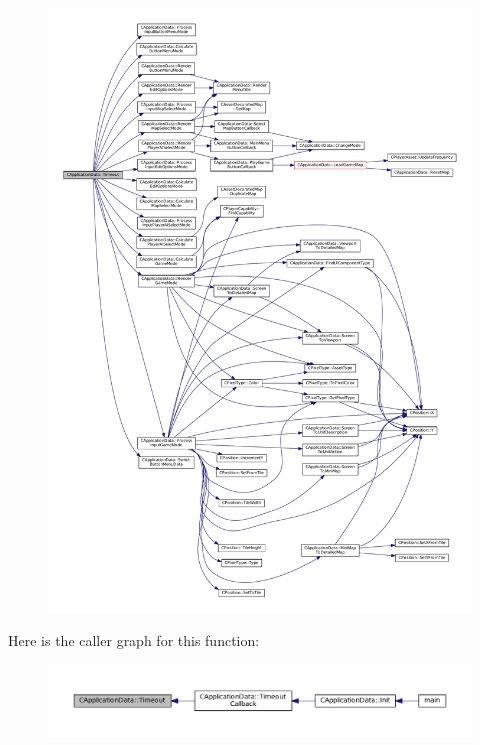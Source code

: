 \begin{figure}[H]
\begin{center}
\leavevmode
\includegraphics[width=350pt]{classCApplicationData_aae0775b38fac01308e8a81b64db49500_cgraph}
\end{center}
\end{figure}
Here is the caller graph for this function\+:
\nopagebreak
\begin{figure}[H]
\begin{center}
\leavevmode
\includegraphics[width=350pt]{classCApplicationData_aae0775b38fac01308e8a81b64db49500_icgraph}
\end{center}
\end{figure}
\hypertarget{classCApplicationData_af66e15f6935f053b46a11aaa51a869c9}{}\label{classCApplicationData_af66e15f6935f053b46a11aaa51a869c9} 
